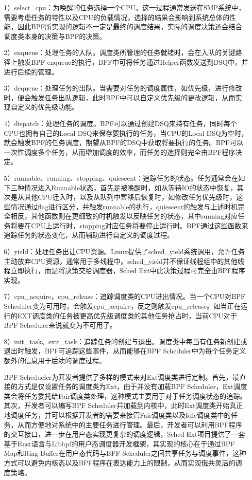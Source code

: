 1）select\_cpu：为唤醒的任务选择一个CPU。这一过程通常发送在SMP系统中，需要考虑任务的特性以及CPU的负载情况，选择的结果会影响到系统总体的性能，因此BPF所实现的逻辑不一定是最终的调度结果，实际的调度决策还会结合调度类本身的决策与BPF的决策。

2）enqueue：处理任务的入队。调度类所管理的任务就绪时，会在入队的关键路径上触发BPF enqueue的执行，BPF中可将任务通过Helper函数发送到DSQ中，并进行后续的管理。

3）dequeue：处理任务的出队。当需要对任务的调度属性，如优先级，进行修改时，便会触发任务出队逻辑，此时BPF中可以自定义优先级的更改逻辑，从而实现自定义的优先级功能。

4）dispatch：处理任务的调度。BPF可以通过创建DSQ来持有任务，同时每个CPU也拥有自己的Local DSQ来保存要执行的任务，当CPU的Local DSQ为空时，就会触发BPF的任务调度，期望从BPF的DSQ中获取将要执行的任务。BPF可以一次性调度多个任务，从而增加调度的效率，而任务的选择则完全由BPF程序决定。

5）runnable、running、stopping、quiescent：追踪任务的状态。任务通常会在如下三种情况进入Runnable状态，首先是被唤醒时，如从等待IO的状态中恢复，其次是从其他CPU迁入时，以及从队列中暂移后恢复时，如修改任务优先级时，这些情况通过flag进行区分，并触发runnable的执行，quiescent的触发与上述时机完全相反，其他函数则在更细致的时机触发以反映任务的状态，其中running对应任务将要在CPU上运行时，stopping对应任务将要停止运行时。BPF通过这些函数来追踪任务的状态变化，从而辅助进行自定义的调度过程。

6）yield：处理任务出让CPU资源。Linux提供了sched\_yield系统调用，允许任务主动放弃CPU资源，通常用于多线程中。sched\_yield并不保证线程组中的其他线程立即执行，而是将决策交给调度器，Sched Ext中此决策过程可完全由BPF程序实现。

7）cpu\_acquire，cpu\_release：追踪调度类的CPU进出情况。当一个CPU对BPF Scheduler变为可用时，会触发cpu\_acquire，反之则触发cpu\_release。如当正在运行的EXT调度类的任务被更高优先级调度类的其他任务抢占时，当前CPU对于BPF Scheduler来说就变为不可用了。

8）init\_task、exit\_task：追踪任务的创建与退出。调度类中每当有任务新创建或退出时触发，BPF可追踪这些事件，从而能够在BPF Scheduler中为每个任务定义额外的信息用于后续的调度过程。

BPF Schedueler为开发者提供了多样的模式来对Ext调度类进行定制。首先，最直接的方式是仅设置任务的调度类为Ext，由于并没有加载BPF Scheduler，Ext调度类会将任务委托给Fair调度类处理，这种模式主要用于对于任务调度状态的追踪。其次，开发者可以编写BPF Scheduler并加载到内核中，此时Ext调度类开始真正地调度任务，并可以根据开发者的需要来接管Fair调度类以及Idle调度类中的任务，从而方便地对系统中的主要任务进行管理。最后，开发者可以利用BPF程序的交互接口，进一步在用户态实现更复杂的调度逻辑，Sched Ext项目提供了一套基于Rust语言与Libbpf的用户态调度器开发框架，其实现的核心在于通过BPF Map和Ring Buffer在用户态代码与BPF Scheduler之间共享任务与调度事件，这种方式可以避免内核态以及BPF程序在表达能力上的限制，从而实现俄共灵活的调度策略。

